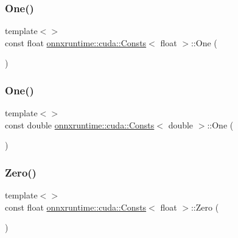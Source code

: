 \subsubsection{\texorpdfstring{One()}{One()}\hspace{0.1cm}{\footnotesize\ttfamily [1/2]}}
{\footnotesize\ttfamily template$<$$>$ \\
const float \mbox{\hyperlink{structonnxruntime_1_1cuda_1_1Consts}{onnxruntime\+::cuda\+::\+Consts}}$<$ float $>$\+::One (\begin{DoxyParamCaption}{ }\end{DoxyParamCaption})}

\mbox{\label{structonnxruntime_1_1cuda_1_1Consts_a0730b21ab3507e324c268ff7144e23e9}} 
\subsubsection{\texorpdfstring{One()}{One()}\hspace{0.1cm}{\footnotesize\ttfamily [2/2]}}
{\footnotesize\ttfamily template$<$$>$ \\
const double \mbox{\hyperlink{structonnxruntime_1_1cuda_1_1Consts}{onnxruntime\+::cuda\+::\+Consts}}$<$ double $>$\+::One (\begin{DoxyParamCaption}{ }\end{DoxyParamCaption})}

\mbox{\label{structonnxruntime_1_1cuda_1_1Consts_a9f77ca6ce91b9f7db9138e20c0ff2faf}} 
\subsubsection{\texorpdfstring{Zero()}{Zero()}\hspace{0.1cm}{\footnotesize\ttfamily [1/2]}}
{\footnotesize\ttfamily template$<$$>$ \\
const float \mbox{\hyperlink{structonnxruntime_1_1cuda_1_1Consts}{onnxruntime\+::cuda\+::\+Consts}}$<$ float $>$\+::Zero (\begin{DoxyParamCaption}{ }\end{DoxyParamCaption})}

